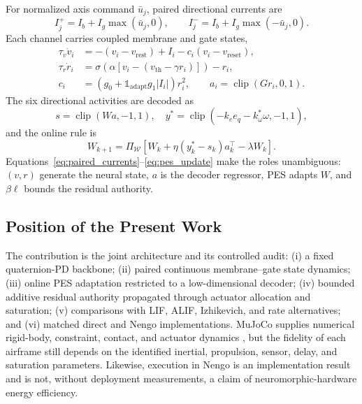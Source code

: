 For normalized axis command $\bar u_j$, paired directional currents are
\begin{equation}
 I_j^+=I_b+I_g\max(\bar u_j,0),\qquad
 I_j^-=I_b+I_g\max(-\bar u_j,0).
 \label{eq:paired_currents}
\end{equation}
Each channel carries coupled membrane and gate states,
\begin{align}
 \tau_v\dot v_i & =-(v_i-v_{\mathrm{rest}})+I_i
       -c_i(v_i-v_{\mathrm{reset}}),\\
 \tau_r\dot r_i & =\sigma\!\left(\alpha[v_i-(v_{\mathrm{th}}-\gamma r_i)]\right)-r_i,\\
 c_i & =\left(g_0+\mathbb{1}_{\mathrm{adapt}}g_1|I_i|\right)r_i^2,\qquad
 a_i=\operatorname{clip}(G r_i,0,1).
 \label{eq:cmg}
\end{align}
The six directional activities are decoded as
\begin{equation}
 s=\operatorname{clip}(Wa,-1,1),
 \quad y^*=\operatorname{clip}(-k_e e_q-k_\omega^*\omega,-1,1),
 \label{eq:decoder_target}
\end{equation}
and the online rule is
\begin{equation}
 W_{k+1}=\Pi_{\mathcal W}\!\left[
 W_k+\eta(y_k^*-s_k)a_k^\top-\lambda W_k\right].
 \label{eq:pes_update}
\end{equation}
Equations~\eqref{eq:paired_currents}--\eqref{eq:pes_update} make the roles
unambiguous: $(v,r)$ generate the neural state, $a$ is the decoder regressor, PES
adapts $W$, and $\beta\ell$ bounds the residual authority.

\subsection{Position of the Present Work}

The contribution is the joint architecture and its controlled audit: (i) a fixed
quaternion-PD backbone; (ii) paired continuous membrane--gate state dynamics;
(iii) online PES adaptation restricted to a low-dimensional decoder; (iv) bounded
additive residual authority propagated through actuator allocation and saturation;
(v) comparisons with LIF, ALIF, Izhikevich, and rate alternatives; and (vi) matched
direct and Nengo implementations.  MuJoCo supplies numerical rigid-body,
constraint, contact, and actuator dynamics \cite{todorov2012mujoco}, but the
fidelity of each airframe still depends on the identified inertial, propulsion,
sensor, delay, and saturation parameters.  Likewise, execution in Nengo is an
implementation result and is not, without deployment measurements, a claim of
neuromorphic-hardware energy efficiency.

